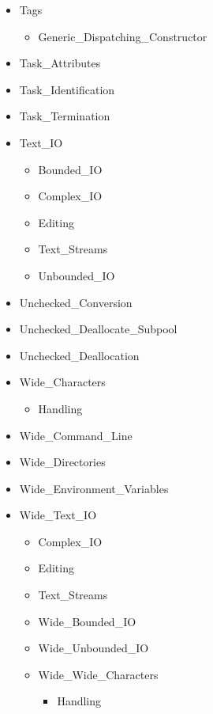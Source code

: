 \documentclass[english]{article}
\begin{document}
\begin{scriptsize}
\begin{multicols*}{5}
\begin{itemize}[leftmargin=0mm]
\begin{itemize}[leftmargin=5mm]
\begin{itemize}[leftmargin=5mm]
         \end{itemize}
      \item[] Tags
         \begin{itemize}[leftmargin=5mm]
            \item[] Generic\_Dispatching\_Constructor
         \end{itemize}
      \item[] Task\_Attributes
      \item[] Task\_Identification
      \item[] Task\_Termination
      \item[] Text\_IO
         \begin{itemize}[leftmargin=5mm]
            \item[] Bounded\_IO
            \item[] Complex\_IO
            \item[] Editing
            \item[] Text\_Streams
            \item[] Unbounded\_IO
         \end{itemize}
      \item[] Unchecked\_Conversion
      \item[] Unchecked\_Deallocate\_Subpool
      \item[] Unchecked\_Deallocation
      \item[] Wide\_Characters
         \begin{itemize}[leftmargin=5mm]
            \item[] Handling
         \end{itemize}
      \item[] Wide\_Command\_Line
      \item[] Wide\_Directories
      \item[] Wide\_Environment\_Variables
      \item[] Wide\_Text\_IO
         \begin{itemize}[leftmargin=5mm]
            \item[] Complex\_IO
            \item[] Editing
            \item[] Text\_Streams
            \item[] Wide\_Bounded\_IO
            \item[] Wide\_Unbounded\_IO
            \item[] Wide\_Wide\_Characters
            \begin{itemize}[leftmargin=5mm]
               \item[] Handling

\end{itemize}
\end{itemize}
\end{itemize}
\end{itemize}
\end{multicols*}
\end{scriptsize}
\end{document}
